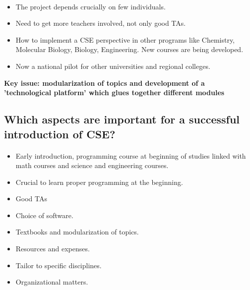 \documentclass[%
twoside,                 %
final,                   %
10pt]{article}
\begin{document}
\paragraph{}

\begin{itemize}
\item The project depends crucially on few individuals. 

\item Need to get more teachers involved, not only good TAs.

\item How  to implement a CSE perspective in other programs like Chemistry, Molecular Biology,  Biology, Engineering. New courses are being developed.

\item Now a national pilot for other universities and regional colleges.
\end{itemize}

\noindent
\textbf{Key issue: modularization of topics and development of a 'technological platform' which glues together different modules}



\subsection{Which aspects are important for a successful introduction of CSE?}

\paragraph{}

\begin{itemize}
\item Early introduction, programming course at beginning of studies linked with math courses and science and engineering courses.

\item Crucial to learn proper programming at the beginning.

\item Good TAs

\item Choice of software.

\item Textbooks and modularization of topics.

\item Resources and expenses.

\item Tailor to specific disciplines.

\item Organizational matters.
\end{itemize}
\end{document}
